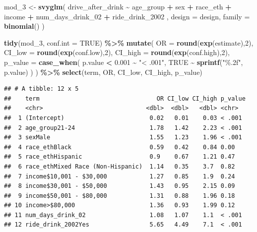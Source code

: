 \documentclass[
]{article}
\newenvironment{Shaded}{\begin{snugshade}}{\end{snugshade}}
\newcommand{\AttributeTok}[1]{\textcolor[rgb]{0.13,0.29,0.53}{#1}}
\newcommand{\ConstantTok}[1]{\textcolor[rgb]{0.56,0.35,0.01}{#1}}
\newcommand{\DecValTok}[1]{\textcolor[rgb]{0.00,0.00,0.81}{#1}}
\newcommand{\FloatTok}[1]{\textcolor[rgb]{0.00,0.00,0.81}{#1}}
\newcommand{\FunctionTok}[1]{\textcolor[rgb]{0.13,0.29,0.53}{\textbf{#1}}}
\newcommand{\NormalTok}[1]{#1}
\newcommand{\OtherTok}[1]{\textcolor[rgb]{0.56,0.35,0.01}{#1}}
\newcommand{\SpecialCharTok}[1]{\textcolor[rgb]{0.81,0.36,0.00}{\textbf{#1}}}
\newcommand{\StringTok}[1]{\textcolor[rgb]{0.31,0.60,0.02}{#1}}
\begin{document}
\begin{Shaded}
\begin{Highlighting}[]
\NormalTok{mod\_3 }\OtherTok{\textless{}{-}} \FunctionTok{svyglm}\NormalTok{(}
\NormalTok{  drive\_after\_drink }\SpecialCharTok{\textasciitilde{}}\NormalTok{ age\_group }\SpecialCharTok{+}\NormalTok{ sex }\SpecialCharTok{+}\NormalTok{ race\_eth }\SpecialCharTok{+}\NormalTok{ income }\SpecialCharTok{+} 
\NormalTok{     num\_days\_drink\_02 }\SpecialCharTok{+}\NormalTok{ ride\_drink\_2002 ,}
  \AttributeTok{design =}\NormalTok{ design,}
  \AttributeTok{family =} \FunctionTok{binomial}\NormalTok{()}
\NormalTok{) }

\FunctionTok{tidy}\NormalTok{(mod\_3, }\AttributeTok{conf.int =} \ConstantTok{TRUE}\NormalTok{) }\SpecialCharTok{\%\textgreater{}\%}
  \FunctionTok{mutate}\NormalTok{(}
    \AttributeTok{OR =} \FunctionTok{round}\NormalTok{(}\FunctionTok{exp}\NormalTok{(estimate),}\DecValTok{2}\NormalTok{),}
    \AttributeTok{CI\_low =} \FunctionTok{round}\NormalTok{(}\FunctionTok{exp}\NormalTok{(conf.low),}\DecValTok{2}\NormalTok{),}
    \AttributeTok{CI\_high =} \FunctionTok{round}\NormalTok{(}\FunctionTok{exp}\NormalTok{(conf.high),}\DecValTok{2}\NormalTok{),}
    \AttributeTok{p\_value =} \FunctionTok{case\_when}\NormalTok{(}
\NormalTok{      p.value }\SpecialCharTok{\textless{}} \FloatTok{0.001} \SpecialCharTok{\textasciitilde{}} \StringTok{"\textless{} .001"}\NormalTok{,}
      \ConstantTok{TRUE} \SpecialCharTok{\textasciitilde{}} \FunctionTok{sprintf}\NormalTok{(}\StringTok{"\%.2f"}\NormalTok{, p.value)}
\NormalTok{    )}
\NormalTok{  ) }\SpecialCharTok{\%\textgreater{}\%}
  \FunctionTok{select}\NormalTok{(term, OR, CI\_low, CI\_high, p\_value)}
\end{Highlighting}
\end{Shaded}

\begin{verbatim}
## # A tibble: 12 x 5
##    term                                 OR CI_low CI_high p_value
##    <chr>                             <dbl>  <dbl>   <dbl> <chr>  
##  1 (Intercept)                        0.02   0.01    0.03 < .001 
##  2 age_group21-24                     1.78   1.42    2.23 < .001 
##  3 sexMale                            1.55   1.23    1.96 < .001 
##  4 race_ethBlack                      0.59   0.42    0.84 0.00   
##  5 race_ethHispanic                   0.9    0.67    1.21 0.47   
##  6 race_ethMixed Race (Non-Hispanic)  1.14   0.35    3.7  0.82   
##  7 income$10,001 - $30,000            1.27   0.85    1.9  0.24   
##  8 income$30,001 - $50,000            1.43   0.95    2.15 0.09   
##  9 income$50,001 - $80,000            1.31   0.88    1.96 0.18   
## 10 income>$80,000                     1.36   0.93    1.99 0.12   
## 11 num_days_drink_02                  1.08   1.07    1.1  < .001 
## 12 ride_drink_2002Yes                 5.65   4.49    7.1  < .001
\end{verbatim}
\end{document}
